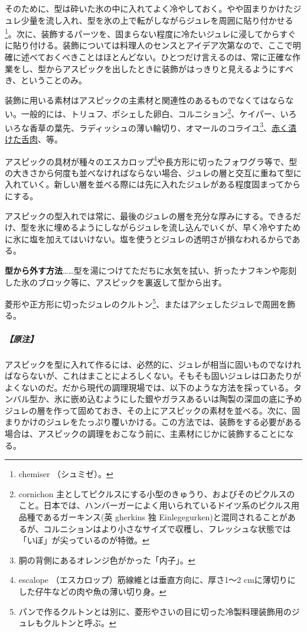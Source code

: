 \begin{Main}
そのために、型は砕いた氷の中に入れてよく冷やしておく。やや固まりかけたジュレ少量を流し入れ、型を氷の上で転がしながらジュレを周囲に貼り付かせる\footnote{chemiser
  （シュミゼ）。}。次に、装飾するパーツを、固まらない程度に冷たいジュレに浸してからすぐに貼り付ける。装飾については料理人のセンスとアイデア次第なので、ここで明確に述べておくべきことはほとんどない。ひとつだけ言えるのは、常に正確な作業をし、型からアスピックを出したときに装飾がはっきりと見えるようにすべき、ということのみ。

装飾に用いる素材はアスピックの主素材と関連性のあるものでなくてはならない。一般的には、トリュフ、ポシェした卵白、コルニション\footnote{cornichon
  主としてピクルスにする小型のきゅうり、およびそのピクルスのこと。日本では、ハンバーガーによく用いられているドイツ系のピクルス用品種であるガーキンス(英
  gherkins 独
  Einlegegurken)と混同されることがあるが、コルニションはより小さなサイズで収穫し、フレッシュな状態では「いぼ」が尖っているのが特徴。}、ケイパー、いろいろな香草の葉先、ラディッシュの薄い輪切り、オマールのコライユ\footnote{胴の背側にあるオレンジ色がかった「内子」。}、\protect\hyperlink{saumure-liquide-pour-langues}{赤く漬けた舌肉}、等。

アスピックの具材が種々のエスカロップ\footnote{escalope
  （エスカロップ）筋線維とは垂直方向に、厚さ1〜2
  cmに薄切りにした仔牛などの肉や魚の薄い切り身。}や長方形に切ったフォワグラ等で、型の大きさから何度も並べなければならない場合、ジュレの層と交互に重ねて型に入れていく。新しい層を並べる際には先に入れたジュレがある程度固まってからにする。

アスピックの型入れでは常に、最後のジュレの層を充分な厚みにする。できるだけ、型を氷に埋めるようにしながらジュレを流し込んでいくが、早く冷やすために氷に塩を加えてはいけない。塩を使うとジュレの透明さが損なわれるからである。

\noindent\textbf{型から外す方法}\ldots{}\ldots{}型を湯につけてただちに水気を拭い、折ったナフキンや彫刻した氷のブロック等に、アスピックを裏返して型から出す。

菱形や正方形に切ったジュレのクルトン\footnote{パンで作るクルトンとは別に、菱形やさいの目に切った冷製料理装飾用のジュレもクルトンと呼ぶ。}、またはアシェしたジュレで周囲を飾る。

\hypertarget{nota-aspics}{%
\subparagraph{【原注】}\label{nota-aspics}}

アスピックを型に入れて作るには、必然的に、ジュレが相当に固いものでなければならないが、これはまことによろしくない。そもそも固いジュレは口あたりがよくないのだ。だから現代の調理現場では、以下のような方法を採っている。タンバル型か、氷に嵌め込むようにした銀やガラスあるいは陶製の深皿の底に予めジュレの層を作って固めておき、その上にアスピックの素材を並べる。次に、固まりかけのジュレをたっぷり覆いかける。この方法では、装飾をする必要がある場合は、アスピックの調理をおこなう前に、主素材にじかに装飾することになる。


\end{Main}
